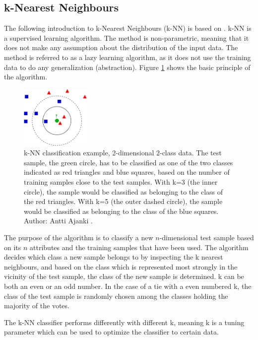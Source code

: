 \subsection{k-Nearest Neighbours}
\label{sec:knn}
The following introduction to k-Nearest Neighbours (k-NN) is based on \citep{mlwr}.
k-NN
is a supervised learning algorithm.
The method is non-parametric,
meaning that it does not make any assumption about the distribution of the input data.
The method is referred to as a lazy learning algorithm,
as it does not use the training data to do any generalization (abstraction).
Figure \ref{fig:knn-example} \citep{knnwiki} shows the basic principle of the algorithm.
\begin{figure}[ht]
\centering
\includegraphics[width = 0.3\textwidth]{img/kNN-classification.png}
\caption[k-NN classification example]{
k-NN classification example, 2-dimensional 2-class data.
The test sample, the green circle,
has to be classified as one of the two classes indicated
as red triangles and blue squares, based on the number
of training samples close to the test samples.
With k=3 (the inner circle), the sample would be classified as belonging
to the class of the red triangles.
With k=5 (the outer dashed circle), the sample would be classified as belonging
to the class of the blue squares.
Author: Antti Ajanki \citep{knnwiki}.
}
\label{fig:knn-example}
\end{figure}

The purpose of the algorithm is to classify a
new \(n\)-dimensional test sample based on its \(n\) attributes
and the training samples that have been used.
The algorithm decides which class a new sample belongs to by
inspecting the k nearest neighbours,
and based on the class which is represented most strongly in the vicinity
of the test sample,
the class of the new sample is determined.
k can be both an even or an odd number.
In the case of a tie with a even numbered k,
the class of the test sample is randomly chosen among the classes holding
the majority of the votes.

The k-NN classifier performs differently with different k,
meaning k is a tuning parameter which can be used to optimize the classifier
to certain data.

